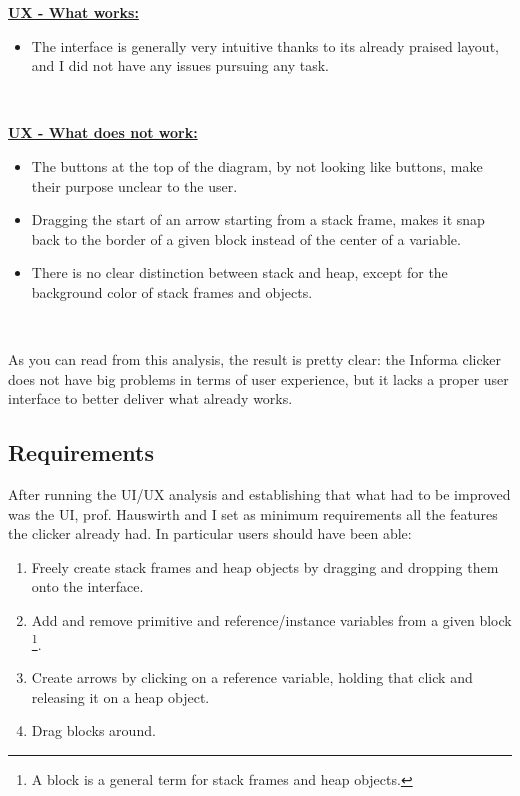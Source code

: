\documentclass[]{usiinfbachelorproject}
\begin{document}
\textbf{\ul{UX - What works:}}

\begin{itemize}
	\item The interface is generally very intuitive thanks to its already praised layout, and I did not have any issues pursuing any task.
\end{itemize}\

\textbf{\ul{UX - What does not work:}}

\begin{itemize}
	\item The buttons at the top of the diagram, by not looking like buttons, make their purpose unclear to the user.
	\item Dragging the start of an arrow starting from a stack frame, makes it snap back to the border of a given block instead of the center of a variable.
	\item There is no clear distinction between stack and heap, except for the background color of stack frames and objects.
\end{itemize}\

\noindent As you can read from this analysis, the result is pretty clear: the Informa clicker does not have big problems in terms of user experience, but it lacks a proper user interface to better deliver what already works.

\vspace{\fill}
\pagebreak

\subsection{Requirements}

After running the UI/UX analysis and establishing that what had to be improved was the UI, prof. Hauswirth and I set as minimum requirements all the features the clicker already had. In particular users should have been able:

\begin{enumerate}
	\item Freely create stack frames and heap objects by dragging and dropping them onto the interface.
	\item Add and remove primitive and reference/instance variables from a given block \footnote{A block is a general term for stack frames and heap objects.}.
	\item Create arrows by clicking on a reference variable, holding that click and releasing it on a heap object.
	\item Drag blocks around.
\end{enumerate}
\end{document}
